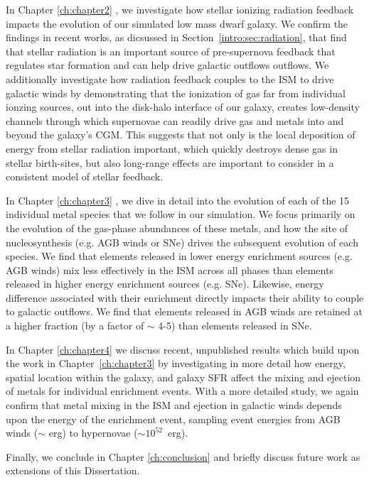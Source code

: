 In Chapter \ref{ch:chapter2} \citep[published as ][]{Emerick2018a}, we investigate how stellar ionizing radiation feedback impacts the evolution of our simulated low mass dwarf galaxy. We confirm the findings in recent works, as dicsussed in Section~\ref{intro:sec:radiation}, that find that stellar radiation is an important source of pre-supernova feedback that regulates star formation and can help drive galactic outflows outflows. We additionally investigate how radiation feedback couples to the ISM to drive galactic winds by demonstrating that the ionization of gas far from individual ionzing sources, out into the disk-halo interface of our galaxy, creates low-density channels through which supernovae can readily drive gas and metals into and beyond the galaxy's CGM. This suggests that not only is the local deposition of energy from stellar radiation important, which quickly destroys dense gas in stellar birth-sites, but also long-range effects are important to consider in a consistent model of stellar feedback.

In Chapter \ref{ch:chapter3} \citep[published as ][]{Emerick2018b}, we dive in detail into the evolution of each of the 15 individual metal species that we follow in our simulation. We focus primarily on the evolution of the gas-phase abundances of these metals, and how the site of nucleosynthesis (e.g. AGB winds or SNe) drives the subsequent evolution of each species. We find that elements released in lower energy enrichment sources (e.g. AGB winds) mix less effectively in the ISM across all phases than elements released in higher energy enrichment sources (e.g. SNe). Likewise, energy difference associated with their enrichment directly impacts their ability to couple to galactic outflows. We find that elements released in AGB winds are retained at a higher fraction (by a factor of $\sim$ 4-5) than elements released in SNe. 

In Chapter \ref{ch:chapter4} we discuss recent, unpublished results which build upon the work in Chapter~\ref{ch:chapter3} by investigating in more detail how energy, spatial location within the galaxy, and galaxy SFR affect the mixing and ejection of metals for individual enrichment events. With a more detailed study, we again confirm that metal mixing in the ISM and ejection in galactic winds depends upon the energy of the enrichment event, sampling event energies from AGB winds ($\sim$ erg) to hypernovae ($\sim 10^{52}$~erg).

Finally, we conclude in Chapter \ref{ch:conclusion} and briefly discuss future work as extensions of this Dissertation.
